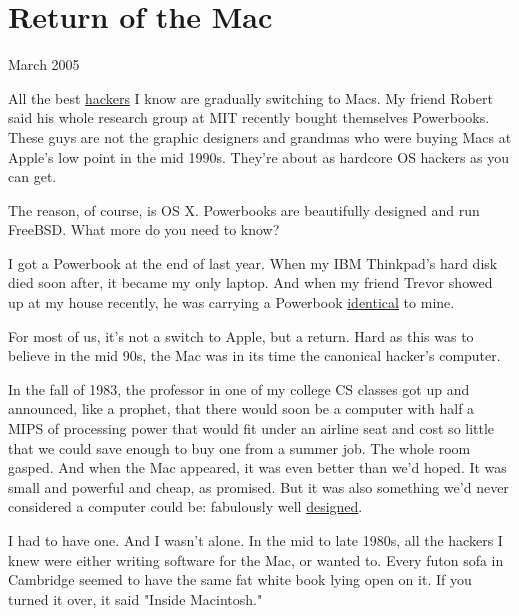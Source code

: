 \chapter{Return of the Mac}


            
              
                

March 2005

All the best
                  \href{http://www.paulgraham.com/gba.html}{hackers} I know are gradually switching
                  to Macs. My friend Robert said his whole research group at MIT
                  recently bought themselves Powerbooks. These guys are not the
                  graphic designers and grandmas who were buying Macs at Apple's
                  low point in the mid 1990s. They're about as hardcore OS
                  hackers as you can get.

The reason, of course, is
                  OS X. Powerbooks are beautifully designed and run FreeBSD.
                  What more do you need to know?

I got a Powerbook at
                  the end of last year. When my IBM Thinkpad's hard disk died
                  soon after, it became my only laptop. And when my friend
                  Trevor showed up at my house recently, he was carrying a
                  Powerbook \href{http://www.paulgraham.com/tlbmac.html}{identical} to mine.

For
                  most of us, it's not a switch to Apple, but a return. Hard as
                  this was to believe in the mid 90s, the Mac was in its time
                  the canonical hacker's computer.

In the fall of
                  1983, the professor in one of my college CS classes got up and
                  announced, like a prophet, that there would soon be a computer
                  with half a MIPS of processing power that would fit under an
                  airline seat and cost so little that we could save enough to
                  buy one from a summer job. The whole room gasped. And when the
                  Mac appeared, it was even better than we'd hoped. It was small
                  and powerful and cheap, as promised. But it was also something
                  we'd never considered a computer could be: fabulously well
                  \href{http://www.paulgraham.com/taste.html}{designed}.

I had to have
                  one. And I wasn't alone. In the mid to late 1980s, all the
                  hackers I knew were either writing software for the Mac, or
                  wanted to. Every futon sofa in Cambridge seemed to have the
                  same fat white book lying open on it. If you turned it over,
                  it said "Inside Macintosh."
                  

